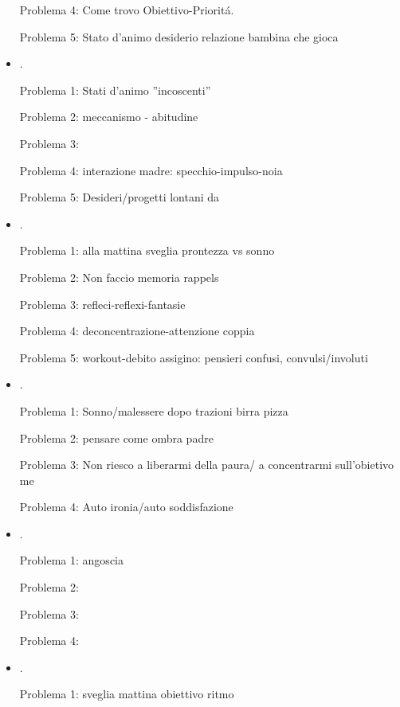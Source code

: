 \begin{itemize}
Problema 4: Come trovo Obiettivo-Priorit\'a.

Problema 5: Stato d'animo desiderio relazione bambina che gioca

\item {}.

Problema 1: Stati d'animo ''incoscenti''

Problema 2: meccanismo - abitudine

Problema 3: 

Problema 4: interazione madre: specchio-impulso-noia

Problema 5: Desideri/progetti lontani da 

\item {}.

Problema 1: alla mattina sveglia prontezza vs sonno

Problema 2: Non faccio memoria rappels

Problema 3: refleci-reflexi-fantasie

Problema 4: deconcentrazione-attenzione coppia

Problema 5: workout-debito assigino: pensieri confusi, convulsi/involuti


\item {}.

Problema 1: Sonno/malessere dopo trazioni birra pizza

Problema 2: pensare come ombra padre 

Problema 3: Non riesco a liberarmi della paura/ a concentrarmi sull'obietivo me

Problema 4: Auto ironia/auto soddisfazione

\item {}.

Problema 1: angoscia

Problema 2: 

Problema 3: 

Problema 4: 

\item {}.

Problema 1: sveglia mattina obiettivo ritmo


\end{itemize}
